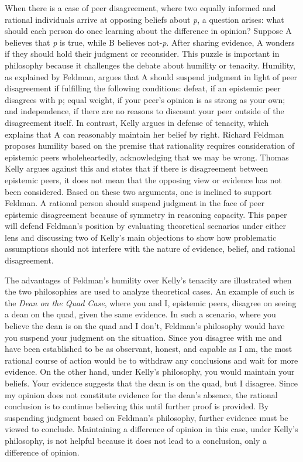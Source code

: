 \documentclass[12pt, a4paper, twoside]{article}
\begin{document}
\maketitle{}

When there is a case of peer disagreement, where two equally informed and rational individuals arrive at opposing beliefs about \emph{p}, a question arises: what should each person do once learning about the difference in opinion? Suppose A believes that \emph{p} is true, while B believes not-\emph{p}. After sharing evidence, A wonders if they should hold their judgment or reconsider. This puzzle is important in philosophy because it challenges the debate about humility or tenacity. Humility, as explained by Feldman, argues that A should suspend judgment in light of peer disagreement if fulfilling the following conditions: defeat, if an epistemic peer disagrees with p; equal weight, if your peer’s opinion is as strong as your own; and independence, if there are no reasons to discount your peer outside of the disagreement itself. In contrast, Kelly argues in defense of tenacity, which explains that A can reasonably maintain her belief by right. Richard Feldman proposes humility based on the premise that rationality requires consideration of epistemic peers wholeheartedly, acknowledging that we may be wrong. Thomas Kelly argues against this and states that if there is disagreement between epistemic peers, it does not mean that the opposing view or evidence has not been considered. Based on these two arguments, one is inclined to support Feldman. A rational person should suspend judgment in the face of peer epistemic disagreement because of symmetry in reasoning capacity. This paper will defend Feldman’s position by evaluating theoretical scenarios under either lens and discussing two of Kelly’s main objections to show how problematic assumptions should not interfere with the nature of evidence, belief, and rational disagreement. 

The advantages of Feldman’s humility over Kelly’s tenacity are illustrated when the two philosophies are used to analyze theoretical cases. An example of such is the \emph{Dean on the Quad Case}, where you and I, epistemic peers, disagree on seeing a dean on the quad, given the same evidence. In such a scenario, where you believe the dean is on the quad and I don’t, Feldman’s philosophy would have you suspend your judgment on the situation. Since you disagree with me and have been established to be as observant, honest, and capable as I am, the most rational course of action would be to withdraw any conclusions and wait for more evidence. On the other hand, under Kelly’s philosophy, you would maintain your beliefs. Your evidence suggests that the dean is on the quad, but I disagree. Since my opinion does not constitute evidence for the dean’s absence, the rational conclusion is to continue believing this until further proof is provided. By suspending judgment based on Feldman’s philosophy, further evidence must be viewed to conclude. Maintaining a difference of opinion in this case, under Kelly’s philosophy, is not helpful because it does not lead to a conclusion, only a difference of opinion. 
\end{document}

